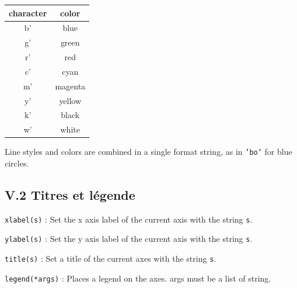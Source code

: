 \documentclass[10pt,fleqn]{article} %
\begin{document}
\hfil
\begin{tabular}{|cc|}
\hline
character & color\\
\hline
b' &  blue \\
g' & green \\
r' & red \\
c' & cyan \\
m' & magenta \\
y'  & yellow \\
k'  & black \\
w'  & white \\
\hline
\end{tabular}


Line styles and colors are combined in a single format string, as in {\tt 'bo'} for blue circles.


\subsection*{V.2 \quad  Titres et l\'egende}

{\tt xlabel(s)} : Set the x axis label of the current axis with the string {\tt s}.

{\tt ylabel(s)} : Set the y axis label of the current axis with the string {\tt s}.

{\tt title(s)} : Set a title of the current axes with the string {\tt s}.

{\tt legend(*args)} : Places a legend on the axes. args must be a list of string.
\end{document}
